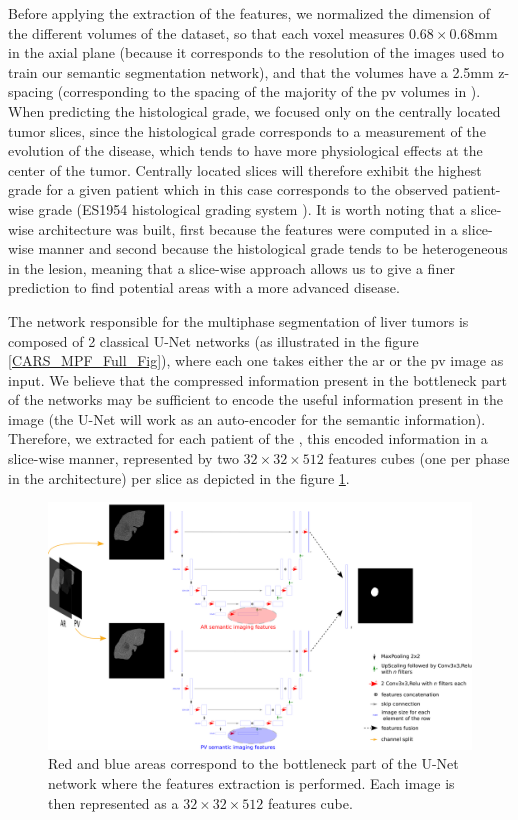 Before applying the extraction of the features, we normalized
the dimension of the different volumes of the dataset, so that each
voxel measures $ 0.68\times0.68 $mm in the axial plane (because it corresponds to
the resolution of the images used to train our semantic segmentation
network), and that the volumes have a 2.5mm z-spacing (corresponding to the
spacing of the majority of the \ac{pv} volumes in \textbf{}).
When predicting the histological grade, we focused only on the centrally located tumor slices, since the histological grade corresponds to a measurement of the evolution of the
disease, which tends to have more physiological effects at the center of
the tumor. Centrally located slices will therefore exhibit the highest
grade for a given patient which in this case
corresponds to the observed patient-wise grade (ES1954 histological grading system \cite{EdmondsonHA1954}). It is worth noting that a slice-wise architecture was built, first because the features were computed in a slice-wise manner and second because the
histological grade tends to be heterogeneous in the lesion, meaning that
a slice-wise approach allows us to give a finer prediction to find
potential areas with a more advanced disease.

The network responsible for the multiphase segmentation of liver tumors is composed of 2 classical U-Net networks (as illustrated in the figure \ref{CARS_MPF_Full_Fig}), where each
one takes either the \ac{ar} or the \ac{pv} image as input. We believe
that the compressed information present in the bottleneck part of the
networks may be sufficient to encode the useful information present in the
image (the U-Net will work as an auto-encoder for the semantic information). Therefore, we extracted for each patient of the \textbf{}, this
encoded information in a slice-wise manner, represented by two $ 32\times32\times512 $
features cubes (one per phase in the  architecture) per slice
as depicted in the figure \ref{fig:MPF_Features_Selection}.


\begin{figure}[!ht]
	\centering
	\includegraphics[width=0.95\linewidth]{../HistologicalGradePrediction/images/MPF_Features_Selection2}
	\caption{Red and blue areas correspond to the bottleneck part of the U-Net
	network where the features extraction is performed. Each image is then
	represented as a $ 32\times32\times512 $ features cube.}
	\label{fig:MPF_Features_Selection}
\end{figure}




